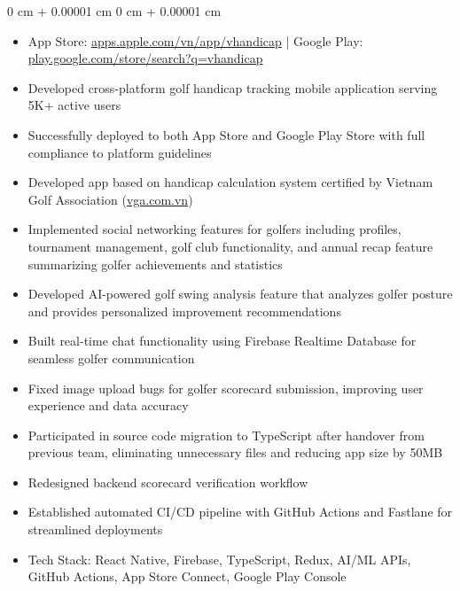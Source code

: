 \documentclass[10pt, letterpaper]{article}
\newenvironment{highlights}{
    \begin{itemize}[
        topsep=0.10 cm,
        parsep=0.10 cm,
        partopsep=0pt,
        itemsep=0pt,
        leftmargin=0 cm + 10pt
    ]
}{
    \end{itemize}
} %
\newenvironment{onecolentry}{
    \begin{adjustwidth}{
        0 cm + 0.00001 cm
    }{
        0 cm + 0.00001 cm
    }
}{
    \end{adjustwidth}
} %
\begin{document}
        \vspace{0.15 cm}
        \begin{onecolentry}
            \begin{highlights}
                \item App Store: \href{https://apps.apple.com/vn/app/vhandicap-handicap-vn-t%E1%BB%AB-vga/id1269491596?l=vi}{apps.apple.com/vn/app/vhandicap} | Google Play: \href{https://play.google.com/store/search?q=vhandicap&c=apps&hl=en}{play.google.com/store/search?q=vhandicap}
                \item Developed cross-platform golf handicap tracking mobile application serving 5K+ active users
                \item Successfully deployed to both App Store and Google Play Store with full compliance to platform guidelines
                \item Developed app based on handicap calculation system certified by Vietnam Golf Association (\href{https://vga.com.vn/}{vga.com.vn})
                \item Implemented social networking features for golfers including profiles, tournament management, golf club functionality, and annual recap feature summarizing golfer achievements and statistics
                \item Developed AI-powered golf swing analysis feature that analyzes golfer posture and provides personalized improvement recommendations
                \item Built real-time chat functionality using Firebase Realtime Database for seamless golfer communication
                \item Fixed image upload bugs for golfer scorecard submission, improving user experience and data accuracy
                \item Participated in source code migration to TypeScript after handover from previous team, eliminating unnecessary files and reducing app size by 50MB
                \item Redesigned backend scorecard verification workflow
                \item Established automated CI/CD pipeline with GitHub Actions and Fastlane for streamlined deployments
                \item Tech Stack: React Native, Firebase, TypeScript, Redux, AI/ML APIs, GitHub Actions, App Store Connect, Google Play Console
            \end{highlights}
        \end{onecolentry}
\end{document}

